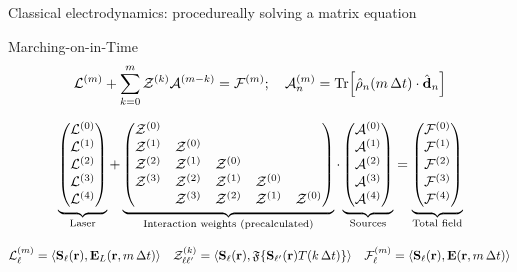 \documentclass[aspectratio=169, usenames, dvipsnames]{beamer}
\newcommand{\oper}[1]{\mathcal{#1}}
\begin{document}
\begin{frame}{Classical electrodynamics: procedureally solving a matrix equation}
  \begin{block}{Marching-on-in-Time}
    \begin{equation*}
    \oper{L}^{(m)} + \sum_{k = 0}^m \oper{Z}^{(k)} \oper{A}^{(m-k)} = \oper{F}^{(m)}; \quad \oper{A}^{(m)}_n = \Trace\!\qty[\hat{\rho}_n(m \, \Delta t) \cdot \hat{\vb{d}}_n]
    \end{equation*}
  \end{block}

  \vspace{-0.5cm}
  \begin{equation*}
    \underbrace{\mqty(\oper{L}^{(0)} \\ \oper{L}^{(1)} \\ \oper{L}^{(2)} \\ \oper{L}^{(3)} \\ \oper{L}^{(4)})}_\text{Laser} +
    \underbrace{\mqty(
      \oper{Z}^{(0)} \\
      \oper{Z}^{(1)} & \oper{Z}^{(0)} \\
      \oper{Z}^{(2)} & \oper{Z}^{(1)} & \oper{Z}^{(0)} \\
      \oper{Z}^{(3)} & \oper{Z}^{(2)} & \oper{Z}^{(1)} & \oper{Z}^{(0)} \\
                                & \oper{Z}^{(3)} & \oper{Z}^{(2)} & \oper{Z}^{(1)} & \oper{Z}^{(0)} \\
      )}_\text{Interaction weights (precalculated)} \cdot
    \underbrace{\mqty(\oper{A}^{(0)} \\ \oper{A}^{(1)} \\ \oper{A}^{(2)} \\ \oper{A}^{(3)} \\ \oper{A}^{(4)})}_\text{Sources} =
    \underbrace{\mqty(\oper{F}^{(0)} \\ \oper{F}^{(1)} \\ \oper{F}^{(2)} \\ \oper{F}^{(3)} \\ \oper{F}^{(4)})}_\text{Total field}
  \end{equation*}

  \begin{equation*}
    \oper{L}^{(m)}_\ell = \langle\vb{S}_\ell(\vb{r}), \vb{E}_L (\vb{r}, m\, \Delta t)\rangle \quad
    \oper{Z}^{(k)}_{\ell\ell'} = \langle\vb{S}_\ell(\vb{r}), \mathfrak{F}\qty{\vb{S}_{\ell'}(\vb{r})T(k \, \Delta t)}\rangle \quad
    \oper{F}^{(m)}_\ell = \langle\vb{S}_\ell(\vb{r}), \vb{E} (\vb{r}, m\, \Delta t)\rangle
  \end{equation*}
\end{frame}
\end{document}
